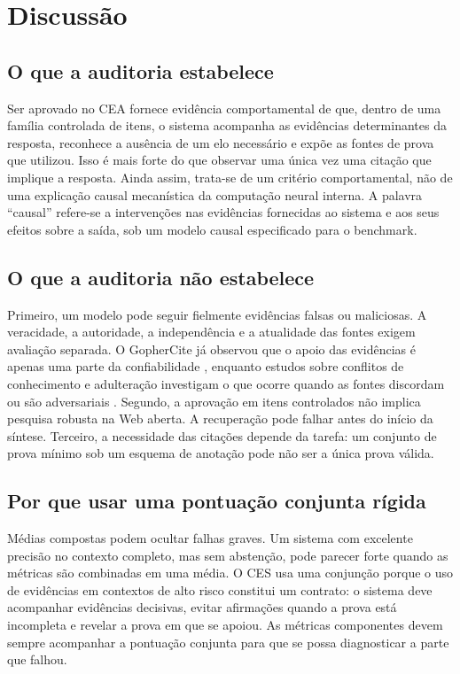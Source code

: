 \documentclass[10pt,twocolumn]{article}
\newcommand{\method}{\textsc{CEA}}
\begin{document}
\section{Discussão}

\subsection{O que a auditoria estabelece}

Ser aprovado no \method{} fornece evidência comportamental de que, dentro de uma família controlada de itens, o sistema acompanha as evidências determinantes da resposta, reconhece a ausência de um elo necessário e expõe as fontes de prova que utilizou. Isso é mais forte do que observar uma única vez uma citação que implique a resposta. Ainda assim, trata-se de um critério comportamental, não de uma explicação causal mecanística da computação neural interna. A palavra ``causal'' refere-se a intervenções nas evidências fornecidas ao sistema e aos seus efeitos sobre a saída, sob um modelo causal especificado para o benchmark.

\subsection{O que a auditoria não estabelece}

Primeiro, um modelo pode seguir fielmente evidências falsas ou maliciosas. A veracidade, a autoridade, a independência e a atualidade das fontes exigem avaliação separada. O GopherCite já observou que o apoio das evidências é apenas uma parte da confiabilidade \citep{menick2022verified}, enquanto estudos sobre conflitos de conhecimento e adulteração investigam o que ocorre quando as fontes discordam ou são adversariais \citep{wang2023conflicts,kumar2026raguard}. Segundo, a aprovação em itens controlados não implica pesquisa robusta na Web aberta. A recuperação pode falhar antes do início da síntese. Terceiro, a necessidade das citações depende da tarefa: um conjunto de prova mínimo sob um esquema de anotação pode não ser a única prova válida.

\subsection{Por que usar uma pontuação conjunta rígida}

Médias compostas podem ocultar falhas graves. Um sistema com excelente precisão no contexto completo, mas sem abstenção, pode parecer forte quando as métricas são combinadas em uma média. O CES usa uma conjunção porque o uso de evidências em contextos de alto risco constitui um contrato: o sistema deve acompanhar evidências decisivas, evitar afirmações quando a prova está incompleta e revelar a prova em que se apoiou. As métricas componentes devem sempre acompanhar a pontuação conjunta para que se possa diagnosticar a parte que falhou.
\end{document}

